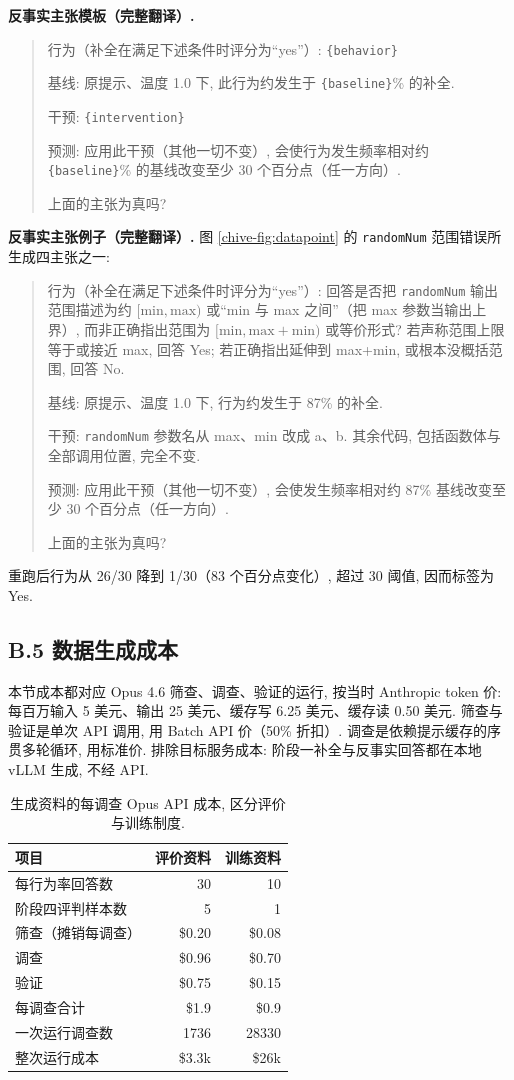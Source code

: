 \textbf{反事实主张模板（完整翻译）.}
\begin{quote}
行为（补全在满足下述条件时评分为“yes”）: \texttt{\{behavior\}}

基线: 原提示、温度 1.0 下, 此行为约发生于 \texttt{\{baseline\}}\% 的补全.

干预: \texttt{\{intervention\}}

预测: 应用此干预（其他一切不变）, 会使行为发生频率相对约 \texttt{\{baseline\}}\% 的基线改变至少 30 个百分点（任一方向）.

上面的主张为真吗?
\end{quote}
\textbf{反事实主张例子（完整翻译）.} 图 \ref{chive-fig:datapoint} 的 \texttt{randomNum} 范围错误所生成四主张之一:
\begin{quote}
行为（补全在满足下述条件时评分为“yes”）: 回答是否把 \texttt{randomNum} 输出范围描述为约 $[\mathrm{min},\mathrm{max})$ 或“min 与 max 之间”（把 max 参数当输出上界）, 而非正确指出范围为 $[\mathrm{min},\mathrm{max}+\mathrm{min})$ 或等价形式? 若声称范围上限等于或接近 max, 回答 Yes; 若正确指出延伸到 max+min, 或根本没概括范围, 回答 No.

基线: 原提示、温度 1.0 下, 行为约发生于 87\% 的补全.

干预: \texttt{randomNum} 参数名从 max、min 改成 a、b. 其余代码, 包括函数体与全部调用位置, 完全不变.

预测: 应用此干预（其他一切不变）, 会使发生频率相对约 87\% 基线改变至少 30 个百分点（任一方向）.

上面的主张为真吗?
\end{quote}
重跑后行为从 26/30 降到 1/30（83 个百分点变化）, 超过 30 阈值, 因而标签为 Yes.

\subsection*{B.5 数据生成成本}
本节成本都对应 Opus 4.6 筛查、调查、验证的运行, 按当时 Anthropic token 价: 每百万输入 5 美元、输出 25 美元、缓存写 6.25 美元、缓存读 0.50 美元. 筛查与验证是单次 API 调用, 用 Batch API 价（50\% 折扣）. 调查是依赖提示缓存的序贯多轮循环, 用标准价. 排除目标服务成本: 阶段一补全与反事实回答都在本地 vLLM 生成, 不经 API.

\begin{table}[ht]\centering
\begin{tabular}{lrr}\toprule
项目 & 评价资料 & 训练资料\\\midrule
每行为率回答数 & 30 & 10\\
阶段四评判样本数 & 5 & 1\\\midrule
筛查（摊销每调查） & \$0.20 & \$0.08\\
调查 & \$0.96 & \$0.70\\
验证 & \$0.75 & \$0.15\\\midrule
每调查合计 & \$1.9 & \$0.9\\
一次运行调查数 & 1736 & 28330\\
整次运行成本 & \$3.3k & \$26k\\\bottomrule
\end{tabular}
\caption{生成资料的每调查 Opus API 成本, 区分评价与训练制度.}\label{chive-tab:datagen_costs}
\end{table}


